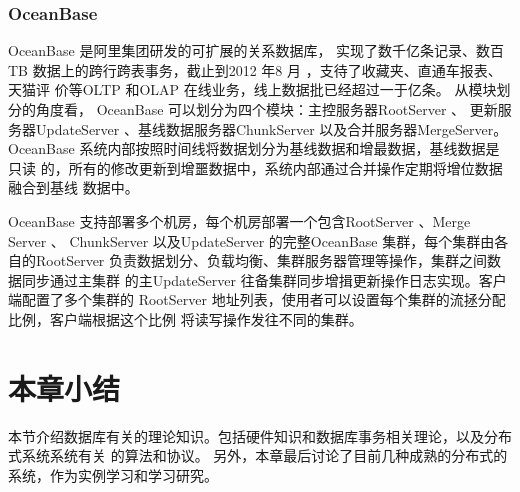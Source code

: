 \subsubsection{OceanBase}
OceanBase 是阿里集团研发的可扩展的关系数据库，
实现了数千亿条记录、数百
TB 数据上的跨行跨表事务，截止到2012 年8 月
，支待了收藏夹、直通车报表、天猫评
价等OLTP 和OLAP 在线业务，线上数据批已经超过一于亿条。
从模块划分的角度看， OceanBase 可以划分为四个模块：主控服务器RootServer 、
更新服务器UpdateServer 
、基线数据服务器ChunkServer 以及合并服务器MergeServer。
OceanBase 系统内部按照时间线将数据划分为基线数据和增最数据，基线数据是只读
的，所有的修改更新到增噩数据中，系统内部通过合并操作定期将增位数据融合到基线
数据中。

OceanBase 支持部署多个机房，每个机房部署一个包含RootServer 、Merge Server 、
ChunkServer 以及UpdateServer 的完整OceanBase 集群，每个集群由各自的RootServer
负责数据划分、负载均衡、集群服务器管理等操作，集群之间数据同步通过主集群
的主UpdateServer 往备集群同步增揖更新操作日志实现。客户端配置了多个集群的
RootServer 地址列表，使用者可以设置每个集群的流拯分配比例，客户端根据这个比例
将读写操作发往不同的集群。
\section{本章小结}
本节介绍数据库有关的理论知识。包括硬件知识和数据库事务相关理论，以及分布式系统系统有关
的算法和协议。
另外，本章最后讨论了目前几种成熟的分布式的系统，作为实例学习和学习研究。